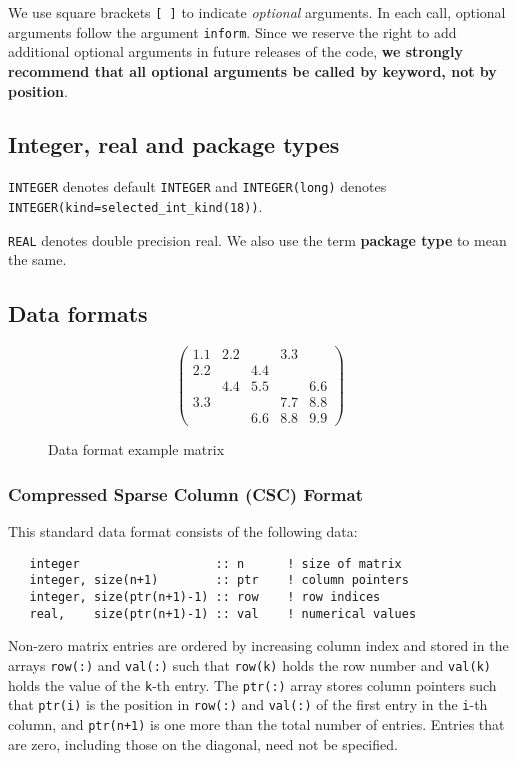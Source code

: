 We use square brackets {\tt [ ]} to indicate {\it optional} arguments.
In each
call, optional arguments follow the argument {\tt inform}.  Since we
reserve the right to add additional optional arguments in future
releases of the code, {\bf we strongly recommend that all optional
arguments be called by keyword, not by position}.

\subsection{Integer, real and package types}\label{Integer kinds}

{\tt INTEGER} denotes default {\tt INTEGER} and
{\tt INTEGER(long)} denotes {\tt INTEGER(kind=selected\_int\_kind(18))}.

\noindent
{\tt REAL} denotes double precision real.
We also use the term {\bf package type} to mean the same.

\subsection{Data formats} \label{dataformats}

\begin{figure}
   \caption{ \label{format eg}
      Data format example matrix
   }
   $$
      \left( \begin{array}{ccccc}
         1.1 & 2.2 &     & 3.3 &     \\
         2.2 &     & 4.4 &     &     \\
             & 4.4 & 5.5 &     & 6.6 \\
         3.3 &     &     & 7.7 & 8.8 \\
             &     & 6.6 & 8.8 & 9.9
      \end{array} \right)
   $$
\end{figure}

\subsubsection{Compressed Sparse Column (CSC) Format} \label{cscformat}
This standard data format consists of the following data:
\begin{verbatim}
   integer                   :: n      ! size of matrix
   integer, size(n+1)        :: ptr    ! column pointers
   integer, size(ptr(n+1)-1) :: row    ! row indices
   real,    size(ptr(n+1)-1) :: val    ! numerical values
\end{verbatim}
Non-zero matrix entries are ordered by increasing column index and stored in
the arrays \texttt{row(:)} and \texttt{val(:)} such that \texttt{row(k)} holds
the row number and \texttt{val(k)} holds the value of the \texttt{k}-th entry.
The \texttt{ptr(:)} array stores column pointers such that \texttt{ptr(i)} is
the position in \texttt{row(:)} and \texttt{val(:)} of
the first entry in the \texttt{i}-th column, and \texttt{ptr(n+1)} is one more
than the total number of entries.
Entries that are zero, including those on the diagonal, need not be specified.

